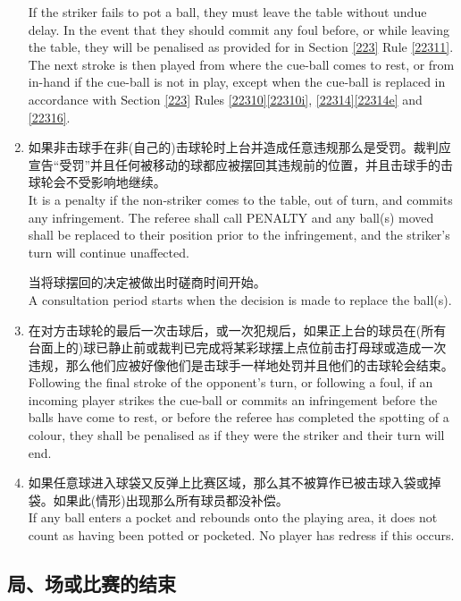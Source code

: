 \begin{enumerate}[label=(\alph*)]
    If the striker fails to pot a ball, they must leave the table without undue delay. In the event that they should commit any foul before, or while leaving the table, they will be penalised as provided for in Section \ref{223} Rule \ref{22311}. The next stroke is then played from where the cue-ball comes to rest, or from in-hand if the cue-ball is not in play, except when the cue-ball is replaced in accordance with Section \ref{223} Rules \ref{22310}\ref{22310i}, \ref{22314}\ref{22314e} and \ref{22316}.
    \item \label{2233k}如果非击球手在非(自己的)击球轮时上台并造成任意违规那么是受罚。裁判应宣告``受罚''并且任何被移动的球都应被摆回其违规前的位置，并且击球手的击球轮会不受影响地继续。\\
    It is a penalty if the non-striker comes to the table, out of turn, and commits any infringement. The referee shall call PENALTY and any ball(s) moved shall be replaced to their position prior to the infringement, and the striker's turn will continue unaffected.

    当将球摆回的决定被做出时磋商时间开始。\\
    A consultation period starts when the decision is made to replace the ball(s).
    \item 在对方击球轮的最后一次击球后，或一次犯规后，如果正上台的球员在(所有台面上的)球已静止前或裁判已完成将某彩球摆上点位前击打母球或造成一次违规，那么他们应被好像他们是击球手一样地处罚并且他们的击球轮会结束。\\
    Following the final stroke of the opponent's turn, or following a foul, if an incoming player strikes the cue-ball or commits an infringement before the balls have come to rest, or before the referee has completed the spotting of a colour, they shall be penalised as if they were the striker and their turn will end.
    \item 如果任意球进入球袋又反弹上比赛区域，那么其不被算作已被击球入袋或掉袋。如果此(情形)出现那么所有球员都没补偿。\\
    If any ball enters a pocket and rebounds onto the playing area, it does not count as having been potted or pocketed. No player has redress if this occurs.
\end{enumerate}

\subsection{局、场或比赛的结束}\label{2234}

